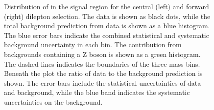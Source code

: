 \begin{figure}[htbp]
\caption{Distribution of \mll in the signal region for the central (left) and forward (right) dilepton selection. The data is shown as black dots, while the total background prediction from data is shown as a blue histogram. The blue error bars indicate the combined statistical and systematic background uncertainty in each bin. The contribution from backgrounds containing a Z boson is shown as a green histogram. The dashed lines indicates the boundaries of the three mass bins. Beneath the plot the ratio of data to the background prediction is shown. The error bars include the statistical uncertainties of data and background, while the blue band indicates the systematic uncertainties on the background. }
\label{fig:timeDependece}
\end{figure}








